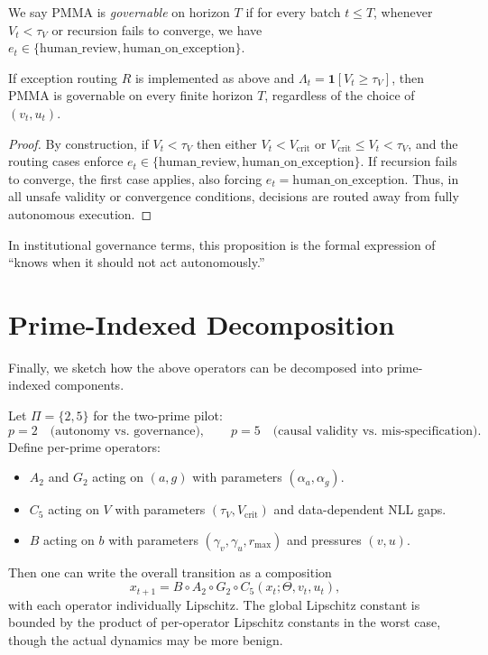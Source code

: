 \documentclass[11pt]{article}
\begin{document}
\begin{definition}[Governability]
We say PMMA is \emph{governable} on horizon $T$ if for every batch $t\le T$, whenever $V_t < \tau_V$ or recursion fails to converge, we have $e_t \in \{\mathrm{human\_review},\mathrm{human\_on\_exception}\}$.
\end{definition}

\begin{proposition}
If exception routing $R$ is implemented as above and $\Lambda_t = \mathbf{1}[V_t \ge \tau_V]$, then PMMA is governable on every finite horizon $T$, regardless of the choice of $(v_t,u_t)$.
\end{proposition}

\begin{proof}
By construction, if $V_t < \tau_V$ then either $V_t < V_{\mathrm{crit}}$ or $V_{\mathrm{crit}} \le V_t < \tau_V$, and the routing cases enforce $e_t\in\{\mathrm{human\_review},\mathrm{human\_on\_exception}\}$.
If recursion fails to converge, the first case applies, also forcing $e_t = \mathrm{human\_on\_exception}$.
Thus, in all unsafe validity or convergence conditions, decisions are routed away from fully autonomous execution.
\end{proof}

In institutional governance terms, this proposition is the formal expression of ``knows when it should not act autonomously.''

\section{Prime-Indexed Decomposition}

Finally, we sketch how the above operators can be decomposed into prime-indexed components.

Let $\Pi = \{2,5\}$ for the two-prime pilot:
\[
  p=2 \quad\text{(autonomy vs.\ governance)},
  \qquad
  p=5 \quad\text{(causal validity vs.\ mis-specification)}.
\]
Define per-prime operators:
\begin{itemize}
  \item $A_2$ and $G_2$ acting on $(a,g)$ with parameters $(\alpha_a,\alpha_g)$.
  \item $C_5$ acting on $V$ with parameters $(\tau_V,V_{\mathrm{crit}})$ and data-dependent NLL gaps.
  \item $B$ acting on $b$ with parameters $(\gamma_v,\gamma_u,r_{\max})$ and pressures $(v,u)$.
\end{itemize}
Then one can write the overall transition as a composition
\[
  x_{t+1} = B \circ A_2 \circ G_2 \circ C_5 (x_t; \Theta,v_t,u_t),
\]
with each operator individually Lipschitz.
The global Lipschitz constant is bounded by the product of per-operator Lipschitz constants in the worst case, though the actual dynamics may be more benign.
\end{document}
